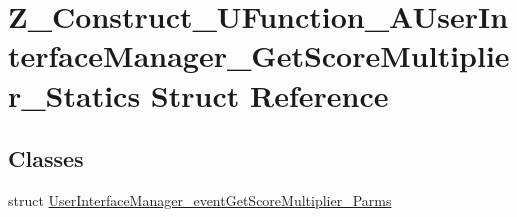 \hypertarget{struct_z___construct___u_function___a_user_interface_manager___get_score_multiplier___statics}{}\section{Z\+\_\+\+Construct\+\_\+\+U\+Function\+\_\+\+A\+User\+Interface\+Manager\+\_\+\+Get\+Score\+Multiplier\+\_\+\+Statics Struct Reference}
\label{struct_z___construct___u_function___a_user_interface_manager___get_score_multiplier___statics}
\subsection*{Classes}
\begin{DoxyCompactItemize}
\item 
struct \mbox{\hyperlink{struct_z___construct___u_function___a_user_interface_manager___get_score_multiplier___statics_1_bba7889cd91eda4060ac59fe48f862d0}{User\+Interface\+Manager\+\_\+event\+Get\+Score\+Multiplier\+\_\+\+Parms}}
\end{DoxyCompactItemize}

